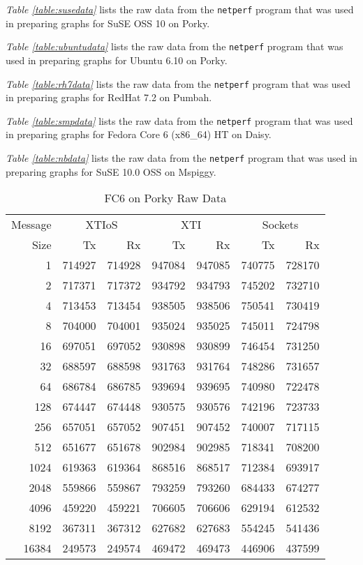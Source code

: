 \documentclass[letterpaper,final,notitlepage,twocolumn,10pt,twoside]{article}
\begin{document}
\begin{appendix}
\textit{Table \ref{table:susedata}} lists the raw data from the
\texttt{netperf} program that was used in preparing graphs for SuSE OSS 10 on
Porky.

\textit{Table \ref{table:ubuntudata}} lists the raw data from the
\texttt{netperf} program that was used in preparing graphs for Ubuntu 6.10 on
Porky.

\textit{Table \ref{table:rh7data}} lists the raw data from the
\texttt{netperf} program that was used in preparing graphs for RedHat 7.2 on
Pumbah.

\textit{Table \ref{table:smpdata}} lists the raw data from the
\texttt{netperf} program that was used in preparing graphs for Fedora Core 6
(x86\_64) HT on Daisy.

\textit{Table \ref{table:nbdata}} lists the raw data from the \texttt{netperf}
program that was used in preparing graphs for SuSE 10.0 OSS on Mspiggy.

\begin{table}[hbp]
\footnotesize
\begin{center}
\setlength{\tabcolsep}{0.3em}
\setlength{\arraycolsep}{0.3em}
\begin{tabular}{rrrrrrr}\\
Message & \multicolumn{2}{c}{XTIoS} & \multicolumn{2}{c}{XTI} & \multicolumn{2}{c}{Sockets}\\
Size & Tx & Rx & Tx & Rx & Tx & Rx\\
\hline
\hline
1 & 714927 & 714928 & 947084 & 947085 & 740775 & 728170\\
2 & 717371 & 717372 & 934792 & 934793 & 745202 & 732710\\
4 & 713453 & 713454 & 938505 & 938506 & 750541 & 730419\\
8 & 704000 & 704001 & 935024 & 935025 & 745011 & 724798\\
16 & 697051 & 697052 & 930898 & 930899 & 746454 & 731250\\
32 & 688597 & 688598 & 931763 & 931764 & 748286 & 731657\\
64 & 686784 & 686785 & 939694 & 939695 & 740980 & 722478\\
128 & 674447 & 674448 & 930575 & 930576 & 742196 & 723733\\
256 & 657051 & 657052 & 907451 & 907452 & 740007 & 717115\\
512 & 651677 & 651678 & 902984 & 902985 & 718341 & 708200\\
1024 & 619363 & 619364 & 868516 & 868517 & 712384 & 693917\\
2048 & 559866 & 559867 & 793259 & 793260 & 684433 & 674277\\
4096 & 459220 & 459221 & 706605 & 706606 & 629194 & 612532\\
8192 & 367311 & 367312 & 627682 & 627683 & 554245 & 541436\\
16384 & 249573 & 249574 & 469472 & 469473 & 446906 & 437599\\
\hline
\end{tabular}
\end{center}
\normalsize
\caption[FC6 on Porky Raw Data]{FC6 on Porky Raw Data}
\label{table:fc6data}
\end{table}


\end{appendix}
\end{document}

